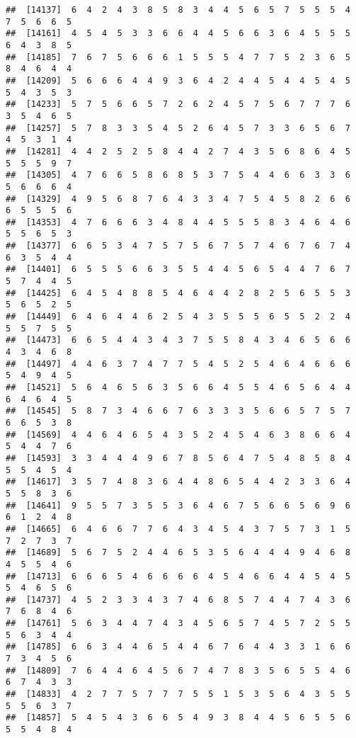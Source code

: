 \documentclass[
]{book}
\begin{document}
\begin{verbatim}
##  [14137]  6  4  2  4  3  8  5  8  3  4  4  5  6  5  7  5  5  5  4  7  5  6  6  5
##  [14161]  4  5  4  5  3  3  6  6  4  4  5  6  6  3  6  4  5  5  5  6  4  3  8  5
##  [14185]  7  6  7  5  6  6  6  1  5  5  5  4  7  7  5  2  3  6  5  8  4  6  4  4
##  [14209]  5  6  6  6  4  4  9  3  6  4  2  4  4  5  4  4  5  4  5  5  4  3  5  3
##  [14233]  5  7  5  6  6  5  7  2  6  2  4  5  7  5  6  7  7  7  6  3  5  4  6  5
##  [14257]  5  7  8  3  3  5  4  5  2  6  4  5  7  3  3  6  5  6  7  4  5  3  1  4
##  [14281]  4  4  2  5  2  5  8  4  4  2  7  4  3  5  6  8  6  4  5  5  5  5  9  7
##  [14305]  4  7  6  6  5  8  6  8  5  3  7  5  4  4  6  6  3  3  6  5  6  6  6  4
##  [14329]  4  9  5  6  8  7  6  4  3  3  4  7  5  4  5  8  2  6  6  6  5  5  5  6
##  [14353]  4  7  6  6  6  3  4  8  4  4  5  5  5  8  3  4  6  4  6  5  5  6  5  3
##  [14377]  6  6  5  3  4  7  5  7  5  6  7  5  7  4  6  7  6  7  4  6  3  5  4  4
##  [14401]  6  5  5  5  6  6  3  5  5  4  4  5  6  5  4  4  7  6  7  5  7  4  4  5
##  [14425]  6  4  5  4  8  8  5  4  6  4  4  2  8  2  5  6  5  5  3  5  6  5  2  5
##  [14449]  6  4  6  4  4  6  2  5  4  3  5  5  5  6  5  5  2  2  4  5  5  7  5  5
##  [14473]  6  6  5  4  4  3  4  3  7  5  5  8  4  3  4  6  5  6  6  4  3  4  6  8
##  [14497]  4  4  6  3  7  4  7  7  5  4  5  2  5  4  6  4  6  6  6  5  4  9  4  5
##  [14521]  5  6  4  6  5  6  3  5  6  6  4  5  5  4  6  5  6  4  4  6  4  6  4  5
##  [14545]  5  8  7  3  4  6  6  7  6  3  3  3  5  6  6  5  7  5  7  6  6  5  3  8
##  [14569]  4  4  6  4  6  5  4  3  5  2  4  5  4  6  3  8  6  6  4  5  4  4  7  6
##  [14593]  3  3  4  4  4  9  6  7  8  5  6  4  7  5  4  8  5  8  4  5  5  4  5  4
##  [14617]  3  5  7  4  8  3  6  4  4  8  6  5  4  4  2  3  3  6  4  5  5  8  3  6
##  [14641]  9  5  5  7  3  5  5  3  6  4  6  7  5  6  6  5  6  9  6  6  1  2  4  8
##  [14665]  6  4  6  6  7  7  6  4  3  4  5  4  3  7  5  7  3  1  5  7  2  7  3  7
##  [14689]  5  6  7  5  2  4  4  6  5  3  5  6  4  4  4  9  4  6  8  4  5  5  4  6
##  [14713]  6  6  6  5  4  6  6  6  6  4  5  4  6  6  4  4  5  4  5  5  4  6  5  6
##  [14737]  4  5  2  3  3  4  3  7  4  6  8  5  7  4  4  7  4  3  6  7  6  8  4  6
##  [14761]  5  6  3  4  4  7  4  3  4  5  6  5  7  4  5  7  2  5  5  5  6  3  4  4
##  [14785]  6  6  3  4  4  6  5  4  4  6  7  6  4  4  3  3  1  6  6  7  3  4  5  6
##  [14809]  7  6  4  4  6  4  5  6  7  4  7  8  3  5  6  5  5  4  6  6  7  4  3  3
##  [14833]  4  2  7  7  5  7  7  7  5  5  1  5  3  5  6  4  3  5  5  5  5  6  3  7
##  [14857]  5  4  5  4  3  6  6  5  4  9  3  8  4  4  5  6  5  5  6  5  5  4  8  4

\end{verbatim}
\end{document}
